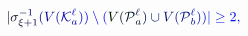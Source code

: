 \documentclass[12pt]{article}
\begin{document}
\makeatletter
\renewcommand*{\@textcolor}[3]{%
  \protect\leavevmode
  \begingroup
    \color#1{#2}#3%
  \endgroup
}
\makeatother
\begin{displaymath}
\mathcolor[RGB]{0,0,15}{|} \mathcolor[RGB]{0,0,30}{\sigma} _ { \mathcolor[RGB]{0,0,45}{\xi} \mathcolor[RGB]{0,0,60}{+} \mathcolor[RGB]{0,0,75}{1} } ^ { \mathcolor[RGB]{0,0,90}{-} \mathcolor[RGB]{0,0,105}{1} } \mathcolor[RGB]{0,0,120}{(} \mathcolor[RGB]{0,0,135}{V} \mathcolor[RGB]{0,0,150}{(} \mathcal { \mathcolor[RGB]{0,0,165}{K} } _ { \mathcolor[RGB]{0,0,180}{a} } ^ { \mathcolor[RGB]{0,0,195}{\ell} } \mathcolor[RGB]{0,0,210}{)} \mathcolor[RGB]{0,0,225}{)} \mathcolor[RGB]{0,0,240}{\setminus} \mathcolor[RGB]{0,0,255}{(} \mathcolor[RGB]{0,15,0}{V} \mathcolor[RGB]{0,15,15}{(} \mathcal { \mathcolor[RGB]{0,15,30}{P} } _ { \mathcolor[RGB]{0,15,45}{a} } ^ { \mathcolor[RGB]{0,15,60}{\ell} } \mathcolor[RGB]{0,15,75}{)} \mathcolor[RGB]{0,15,90}{\cup} \mathcolor[RGB]{0,15,105}{V} \mathcolor[RGB]{0,15,120}{(} \mathcal { \mathcolor[RGB]{0,15,135}{P} } _ { \mathcolor[RGB]{0,15,150}{b} } ^ { \mathcolor[RGB]{0,15,165}{\ell} } \mathcolor[RGB]{0,15,180}{)} \mathcolor[RGB]{0,15,195}{)} \mathcolor[RGB]{0,15,210}{|} \mathcolor[RGB]{0,15,225}{\geq} \mathcolor[RGB]{0,15,240}{2} \mathcolor[RGB]{0,15,255}{,}
\end{displaymath}
\end{document}
